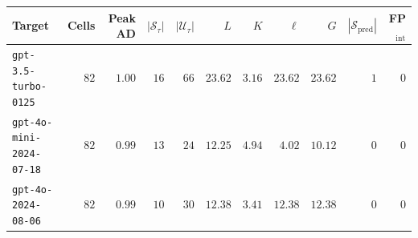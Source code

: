 \footnotesize
\setlength{\tabcolsep}{3.5pt}
\begin{tabular}{lrrrrrrrrrr}
\toprule
Target                                & Cells & Peak AD & $|\mathcal{S}_\tau|$ & $|\mathcal{U}_\tau|$ & $L$ & $K$ & $\ell$ & $G$ & $|\mathcal{S}_{\mathrm{pred}}|$ & FP$_{\mathrm{int}}$ \\
\midrule
\texttt{gpt-3.5-turbo-0125}           & $82$ & $1.00$ & $16$ & $66$ & $23.62$ & $3.16$ & $23.62$ & $23.62$ & $1$ & $0$ \\
\texttt{gpt-4o-mini-2024-07-18}       & $82$ & $0.99$ & $13$ & $24$ & $12.25$ & $4.94$ & $ 4.02$ & $10.12$ & $0$ & $0$ \\
\texttt{gpt-4o-2024-08-06}            & $82$ & $0.99$ & $10$ & $30$ & $12.38$ & $3.41$ & $12.38$ & $12.38$ & $0$ & $0$ \\
\bottomrule
\end{tabular}
